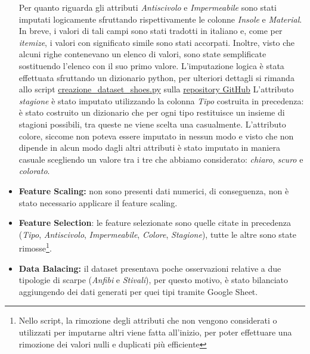 \documentclass[a4paper, 11pt, oneside]{report}
\begin{document}
\begin{itemize}
\begin{center}
                    \end{center}
                    Per quanto riguarda gli attributi  \emph{Antiscivolo} e \emph{Impermeabile} sono stati imputati
                    logicamente sfruttando rispettivamente le colonne \emph{Insole} e \emph{Material}.
                    In breve, i valori di tali campi sono stati tradotti in italiano e, come per \emph{itemize}, i valori con significato simile sono stati
                    accorpati.
                    Inoltre, visto che alcuni righe contenevano un elenco di valori, sono state semplificate sostituendo l'elenco con il suo primo valore.
                    L'imputazione logica è stata effettuata sfruttando un dizionario python, per ulteriori dettagli si rimanda allo script
                    \href{https://github.com/frankzamma/NC22_WeatherStyle_classe03/blob/b8a2eb2de4f72fd37752e2c480e764e8797826f8/CreazioneDatasets/dataset_shoes/creazione_dataset_shoes.py}{creazione\_dataset\_shoes.py} sulla \href{https://github.com/frankzamma/NC22_WeatherStyle_classe03}{repository GitHub}
                    L'attributo \emph{stagione} è stato imputato utilizzando la colonna \emph{Tipo} costruita in precedenza: è stato costruito un dizionario
                    che per ogni tipo restituisce un insieme di stagioni possibili, tra queste ne viene scelta una casualmente.
                    L'attributo colore, siccome non poteva essere imputato in nessun modo e visto che non dipende in alcun modo dagli altri attributi
                    è stato imputato in maniera casuale scegliendo un valore tra i tre che abbiamo considerato: \emph{chiaro}, \emph{scuro} e \emph{colorato}.
                    \item \textbf{Feature Scaling:} non sono presenti dati numerici, di conseguenza, non è stato necessario applicare il feature scaling.
                    \item \textbf{Feature Selection}: le feature selezionate sono quelle citate in precedenza (\emph{Tipo}, \emph{Antiscivolo}, \emph{Impermeabile}, \emph{Colore}, \emph{Stagione}),
                    tutte le altre sono state rimosse\footnote{Nello script, la rimozione degli attributi che non vengono
                    considerati o utilizzati per imputarne altri viene fatta all'inizio, per poter effettuare una rimozione dei valori nulli e duplicati più efficiente}.
                    \item \textbf{Data Balacing:} il dataset presentava poche osservazioni relative a due tipologie di scarpe (\emph{Anfibi} e \emph{Stivali}), per questo motivo, è stato bilanciato aggiungendo dei dati generati per quei tipi tramite Google Sheet.
                \end{itemize}
                \newpage
\end{document}
